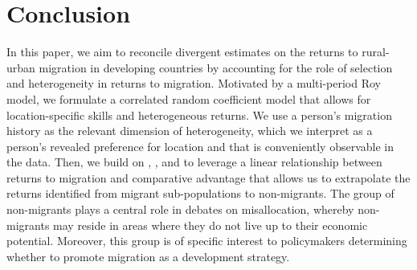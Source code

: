 \documentclass[12pt]{article}
\begin{document}






\FloatBarrier
\section{Conclusion}\label{sec:conclusion}

In this paper, we aim to reconcile divergent estimates on the returns to rural-urban migration in developing countries by accounting for the role of selection and heterogeneity in returns to migration. Motivated by a multi-period Roy model, we formulate a correlated random coefficient model that allows for location-specific skills and heterogeneous returns.  
We use a person’s migration history as the relevant dimension of heterogeneity, which we interpret as a person’s revealed preference for location and that is conveniently observable in the data. 
Then, we build on \cite{suriSelectionComparativeAdvantage2011}, 
\cite{lemieuxEstimatingEffectsUnions1998}, and   \cite{tjernstromCommentSuri2011} to leverage a linear relationship between returns to migration and comparative advantage that allows us to extrapolate the returns identified from migrant sub-populations to non-migrants.
The group of non-migrants plays a central role in debates on misallocation, whereby non-migrants may reside in areas where they do not live up to their economic potential. 
Moreover, this group is of specific interest to policymakers determining whether to promote migration as a development strategy.
\end{document}
